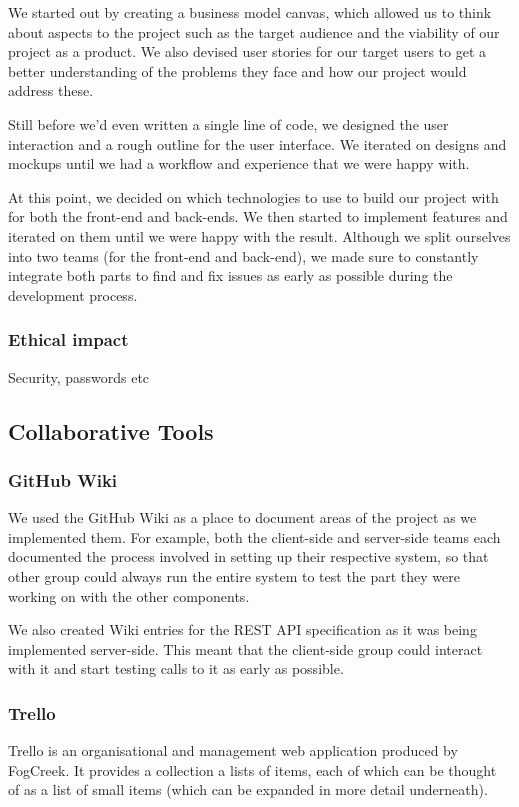 \documentclass[11pt]{article}
\let\footnote=\endnote
\begin{document}
We started out by creating a business model canvas, which allowed us to think about aspects to the project such as the target audience and the viability of our project as a product. We also devised user stories for our target users to get a better understanding of the problems they face and how our project would address these.

Still before we'd even written a single line of code, we designed the user interaction and a rough outline for the user interface. We iterated on designs and mockups until we had a workflow and experience that we were happy with.

At this point, we decided on which technologies to use to build our project with for both the front-end and back-ends. We then started to implement features and iterated on them until we were happy with the result. Although we split ourselves into two teams (for the front-end and back-end), we made sure to constantly integrate both parts to find and fix issues as early as possible during the development process.

\subsubsection {Ethical impact}
Security, passwords etc

\subsection {Collaborative Tools}
\subsubsection {GitHub Wiki}
We used the GitHub Wiki as a place to document areas of the project as we implemented them. For example, both the client-side and server-side teams each documented the process involved in setting up their respective system, so that other group could always run the entire system to test the part they were working on with the other components.

We also created Wiki entries for the REST API specification as it was being implemented server-side. This meant that the client-side group could interact with it and start testing calls to it as early as possible.
\subsubsection {Trello}

Trello\footnote{\url{http://trello.com}} is an organisational and management web application produced by FogCreek. It provides a collection a lists of items, each of which can be thought of as a list of small items (which can be expanded in more detail underneath).
\end{document}
